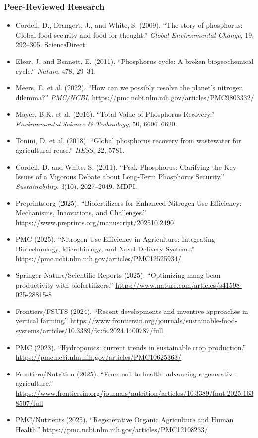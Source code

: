 \documentclass[11pt,letterpaper]{article}
\begin{document}
\subsubsection{Peer-Reviewed Research}
\begin{itemize}[leftmargin=1.5em]
  \item Cordell, D., Drangert, J., and White, S. (2009). ``The story of phosphorus: Global food security and food for thought.'' \textit{Global Environmental Change}, 19, 292--305. ScienceDirect.
  \item Elser, J. and Bennett, E. (2011). ``Phosphorus cycle: A broken biogeochemical cycle.'' \textit{Nature}, 478, 29--31.
  \item Meers, E. et al. (2022). ``How can we possibly resolve the planet's nitrogen dilemma?'' \textit{PMC/NCBI}. \url{https://pmc.ncbi.nlm.nih.gov/articles/PMC9803332/}
  \item Mayer, B.K. et al. (2016). ``Total Value of Phosphorus Recovery.'' \textit{Environmental Science \& Technology}, 50, 6606--6620.
  \item Tonini, D. et al. (2018). ``Global phosphorus recovery from wastewater for agricultural reuse.'' \textit{HESS}, 22, 5781.
  \item Cordell, D. and White, S. (2011). ``Peak Phosphorus: Clarifying the Key Issues of a Vigorous Debate about Long-Term Phosphorus Security.'' \textit{Sustainability}, 3(10), 2027--2049. MDPI.
  \item Preprints.org (2025). ``Biofertilizers for Enhanced Nitrogen Use Efficiency: Mechanisms, Innovations, and Challenges.'' \url{https://www.preprints.org/manuscript/202510.2490}
  \item PMC (2025). ``Nitrogen Use Efficiency in Agriculture: Integrating Biotechnology, Microbiology, and Novel Delivery Systems.'' \url{https://pmc.ncbi.nlm.nih.gov/articles/PMC12525934/}
  \item Springer Nature/Scientific Reports (2025). ``Optimizing mung bean productivity with biofertilizers.'' \url{https://www.nature.com/articles/s41598-025-28815-8}
  \item Frontiers/FSUFS (2024). ``Recent developments and inventive approaches in vertical farming.'' \url{https://www.frontiersin.org/journals/sustainable-food-systems/articles/10.3389/fsufs.2024.1400787/full}
  \item PMC (2023). ``Hydroponics: current trends in sustainable crop production.'' \url{https://pmc.ncbi.nlm.nih.gov/articles/PMC10625363/}
  \item Frontiers/Nutrition (2025). ``From soil to health: advancing regenerative agriculture.'' \url{https://www.frontiersin.org/journals/nutrition/articles/10.3389/fnut.2025.1638507/full}
  \item PMC/Nutrients (2025). ``Regenerative Organic Agriculture and Human Health.'' \url{https://pmc.ncbi.nlm.nih.gov/articles/PMC12108233/}
\end{itemize}
\end{document}
